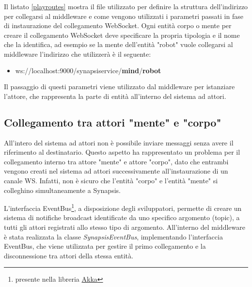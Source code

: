 

Il listato \ref{playroutes} mostra il file utilizzato per definire la struttura dell'indirizzo per collegarsi al middleware e come vengono utilizzati i parametri passati in fase di instaurazione del collegamento WebSocket. Ogni entità corpo o mente per creare il collegamento WebSocket deve specificare la propria tipologia e il nome che la identifica, ad esempio se la mente dell'entità "robot" vuole collegarsi al middleware l'indirizzo che utilizzerà è il seguente:

\begin{itemize}
    \item ws://localhost:9000/synapsiservice/\textbf{mind}/\textbf{robot}
\end{itemize}

Il passaggio di questi parametri viene utilizzato dal middleware per istanziare l'attore, che rappresenta la parte di entità all'interno del sistema ad attori.

\subsection{Collegamento tra attori "mente" e "corpo"}

All'intero del sistema ad attori non è possibile inviare messaggi senza avere il riferimento al destinatario. Questo aspetto ha rappresentato un problema per il collegamento interno tra attore "mente" e attore "corpo", dato che entrambi vengono creati nel sistema ad attori successivamente all'instaurazione di un canale WS. Infatti, non è sicuro che l'entità "corpo" e l'entità "mente" si colleghino simultaneamente a Synapsis.

\medskip

L'interfaccia EventBus\footnote{presente nella libreria \href{https://doc.akka.io/docs/akka/current/event-bus.html}{Akka}}, a disposizione degli sviluppatori, permette di creare un sistema di notifiche broadcast identificate da uno specifico argomento (topic), a tutti gli attori registrati allo stesso tipo di argomento. All'interno del middleware è stata realizzata la classe \textit{SynapsisEventBus}, implementando l'interfaccia EventBus, che viene utilizzata per gestire il primo collegamento e la disconnessione tra attori della stessa entità.

